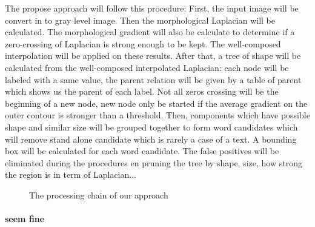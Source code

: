 \par The propose approach will follow this procedure: First, the input image will be convert in to gray level image. Then the morphological Laplacian will be calculated. The morphological gradient will also be calculate to determine if a zero-crossing of Laplacian is strong enough to be kept. The well-composed interpolation will be applied on these results. After that, a tree of shape will be calculated from the well-composed interpolated Laplacian: each node will be labeled with a same value, the parent relation will be given by a table of parent which shows us the parent of each label. Not all zeros crossing will be the beginning of a new node, new node only be started if the average gradient on the outer contour is stronger than a threshold. Then, components which have possible shape and similar size will be grouped together to form word candidates which will remove stand alone candidate which is rarely a case of a text. A bounding box will be calculated for each word candidate. The false positives will be eliminated during the procedures en pruning the tree by shape, size, how strong the region is in term of Laplacian...

\begin{figure}
 \begin{center}
  \caption{The processing chain of our approach}
  \label{Process}
 \end{center}
\end{figure}

\paragraph{seem fine}